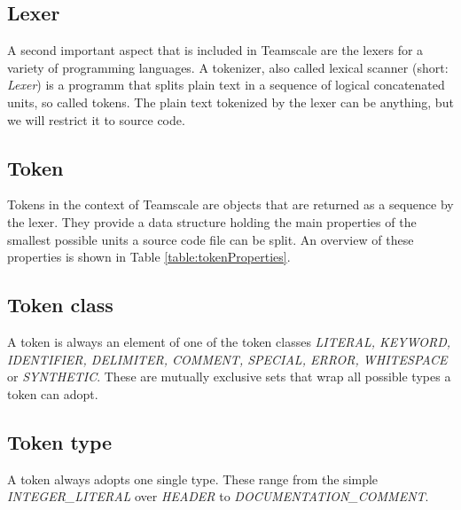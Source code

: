 \subsection{Lexer}
A second important aspect that is included in Teamscale are the lexers for a variety of programming languages. A tokenizer, also called lexical scanner (short: \textit{Lexer}) is a programm that splits plain text in a sequence of logical concatenated units, so called tokens. The plain text tokenized by the lexer can be anything, but we will restrict it to source code.
\subsection{Token}
\label{section:token}
Tokens in the context of Teamscale are objects that are returned as a sequence by the lexer. They provide a data structure holding the main properties of the smallest possible units a source code file can be split. An overview of these properties is shown in Table \ref{table:tokenProperties}.


\subsection{Token class}
A token is always an element of one of the token classes \textit{LITERAL, KEYWORD, IDENTIFIER, DELIMITER, COMMENT, SPECIAL, ERROR, WHITESPACE} or \textit{SYNTHETIC}. These are mutually exclusive sets that wrap all possible types a token can adopt.

\subsection{Token type}
A token always adopts one single type. These range from the simple \textit{INTEGER\_LITERAL} over \textit{HEADER} to \textit{DOCUMENTATION\_COMMENT}.
